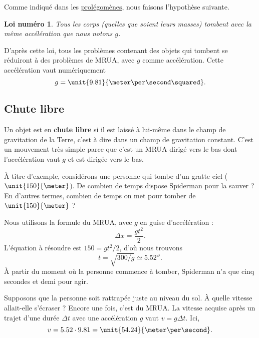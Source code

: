 \documentclass[a4paper,12pt]{book}
\newcounter{numloiphyz}
\theoremstyle{mes_exemples}	\newtheorem{exemple}[numtho]{Exemple}
\theoremstyle{mes_tho}
\newtheorem{loiphyz}[numloiphyz]{Loi numéro}
\newcommand{\defe}[2]{\textbf{#1}\index{#2}}
\begin{document}
Comme indiqué dans les \href{http://fr.wiktionary.org/wiki/prolégomènes}{prolégomènes}, nous faisons l'hypothèse suivante.
\setcounter{numloiphyz}{0}		%
\begin{loiphyz}
	Tous les corps (quelles que soient leurs masses) tombent avec la même accélération que nous notons $g$.
\end{loiphyz}
D'après cette loi, tous les problèmes contenant des objets qui tombent se réduiront à des problèmes de MRUA, avec $g$ comme accélération. Cette accélération vaut numériquement
\begin{equation}
	g=\unit{9.81}{\meter\per\second\squared}.
\end{equation}

\subsection{Chute libre}

Un objet est en \defe{chute libre}{Chute libre} si il est laissé à lui-même dans le champ de gravitation de la Terre, c'est à dire dans un champ de gravitation constant. C'est un mouvement très simple parce que c'est un MRUA dirigé vers le bas dont l'accélération vaut $g$ et est dirigée vers le bas.

À titre d'exemple, considérons une personne qui tombe d'un gratte ciel ($\unit{150}{\meter}$). De combien de temps dispose Spiderman pour la sauver ? En d'autres termes, combien de temps on met pour tomber de $\unit{150}{\meter}$ ?

Nous utilisons la formule du MRUA, avec $g$ en guise d'accélération :
\begin{equation}
	\Delta x=\frac{ gt^2 }{ 2 }.
\end{equation}
L'équation à résoudre est $150=gt^2/2$, d'où nous trouvons
\begin{equation}
	t=\sqrt{300/g}\simeq \unit{5.52}{\second}.
\end{equation}
À partir du moment où la personne commence à tomber, Spiderman n'a que cinq secondes et demi pour agir.

Supposons que la personne soit rattrapée juste au niveau du sol. À quelle vitesse allait-elle s'écraser ? Encore une fois, c'est du MRUA. La vitesse acquise après un trajet d'une durée $\Delta t$ avec une accélération $g$ vaut $v=g\Delta t$. Ici,
\begin{equation}
	v=5.52\cdot 9.81=\unit{54.24}{\meter\per\second}.
\end{equation}
\end{document}

